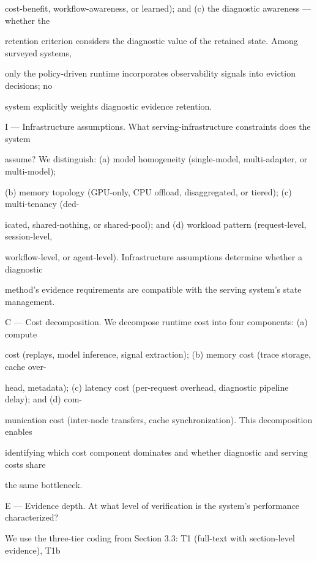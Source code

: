 \begin{flushleft}
\noindent cost-benefit, workflow-awareness, or learned); and (c) the diagnostic awareness — whether the\par
\noindent retention criterion considers the diagnostic value of the retained state. Among surveyed systems,\par
\noindent only the policy-driven runtime incorporates observability signals into eviction decisions; no\par
\noindent system explicitly weights diagnostic evidence retention.\par
\par\smallskip
\noindent I — Infrastructure assumptions. What serving-infrastructure constraints does the system\par
\noindent assume? We distinguish: (a) model homogeneity (single-model, multi-adapter, or multi-model);\par
\noindent (b) memory topology (GPU-only, CPU offload, disaggregated, or tiered); (c) multi-tenancy (ded-\par
\noindent icated, shared-nothing, or shared-pool); and (d) workload pattern (request-level, session-level,\par
\noindent workflow-level, or agent-level). Infrastructure assumptions determine whether a diagnostic\par
\noindent method’s evidence requirements are compatible with the serving system’s state management.\par
\par\smallskip
\noindent C — Cost decomposition. We decompose runtime cost into four components: (a) compute\par
\noindent cost (replays, model inference, signal extraction); (b) memory cost (trace storage, cache over-\par
\noindent head, metadata); (c) latency cost (per-request overhead, diagnostic pipeline delay); and (d) com-\par
\noindent munication cost (inter-node transfers, cache synchronization). This decomposition enables\par
\noindent identifying which cost component dominates and whether diagnostic and serving costs share\par
\noindent the same bottleneck.\par
\par\smallskip
\noindent E — Evidence depth. At what level of verification is the system’s performance characterized?\par
\noindent We use the three-tier coding from Section 3.3: T1 (full-text with section-level evidence), T1b\par

\end{flushleft}
